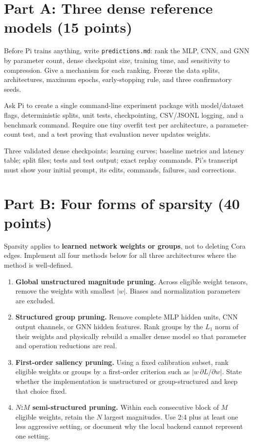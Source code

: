 \documentclass[11pt,letterpaper]{article}
\begin{document}
\section{Part A: Three dense reference models \texorpdfstring{\hfill}{} (15 points)}
\begin{humanbox}
Before Pi trains anything, write \texttt{predictions.md}: rank the MLP, CNN, and GNN by parameter count, dense checkpoint size, training time, and sensitivity to compression. Give a mechanism for each ranking. Freeze the data splits, architectures, maximum epochs, early-stopping rule, and three confirmatory seeds.
\end{humanbox}
\begin{agentbox}
Ask Pi to create a single command-line experiment package with model/dataset flags, deterministic splits, unit tests, checkpointing, CSV/JSONL logging, and a benchmark command. Require one tiny overfit test per architecture, a parameter-count test, and a test proving that evaluation never updates weights.
\end{agentbox}
\begin{deliver}
Three validated dense checkpoints; learning curves; baseline metrics and latency table; split files; tests and test output; exact replay commands. Pi's transcript must show your initial prompt, its edits, commands, failures, and corrections.
\end{deliver}

\section{Part B: Four forms of sparsity \texorpdfstring{\hfill}{} (40 points)}
Sparsity applies to \textbf{learned network weights or groups}, not to deleting Cora edges. Implement all four methods below for all three architectures where the method is well-defined.

\begin{enumerate}[label=\textbf{S\arabic*.}]
 \item \textbf{Global unstructured magnitude pruning.} Across eligible weight tensors, remove the weights with smallest $|w|$. Biases and normalization parameters are excluded.
 \item \textbf{Structured group pruning.} Remove complete MLP hidden units, CNN output channels, or GNN hidden features. Rank groups by the $L_1$ norm of their weights and physically rebuild a smaller dense model so that parameter and operation reductions are real.
 \item \textbf{First-order saliency pruning.} Using a fixed calibration subset, rank eligible weights or groups by a first-order criterion such as $|w\,\partial L/\partial w|$. State whether the implementation is unstructured or group-structured and keep that choice fixed.
 \item \textbf{$N$:$M$ semi-structured pruning.} Within each consecutive block of $M$ eligible weights, retain the $N$ largest magnitudes. Use 2:4 plus at least one less aggressive setting, or document why the local backend cannot represent one setting.
\end{enumerate}
\end{document}
